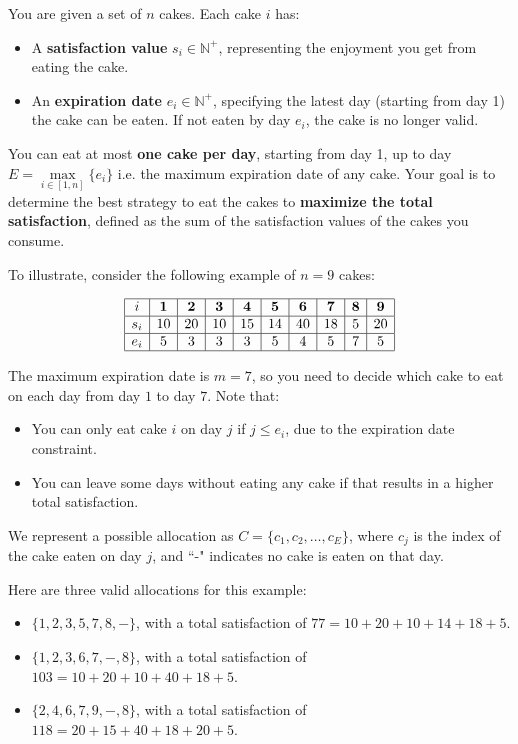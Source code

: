  
You are given a set of \( n \) cakes. Each cake \( i \) has:
\begin{itemize}
    \item A \textbf{satisfaction value} \( s_i\in\mathbb N^+ \), representing the enjoyment you get from eating the cake.
    \item An \textbf{expiration date} \( e_i\in\mathbb N^+ \), specifying the latest day (starting from day 1) the cake can be eaten. If not eaten by day \( e_i \), the cake is no longer valid.
\end{itemize}

You can eat at most \textbf{one cake per day}, starting from day 1, up to day $E=\max\limits_{i\in[1,n]} \{e_i\}$ i.e. the maximum expiration date of any cake. Your goal is to determine the best strategy to eat the cakes to \textbf{maximize the total satisfaction}, defined as the sum of the satisfaction values of the cakes you consume.

To illustrate, consider the following example of \( n = 9 \) cakes:

\[
\begin{array}{|c|c|c|c|c|c|c|c|c|c|c|}
    \hline
    i & \textbf{1} & \textbf{2} & \textbf{3} & \textbf{4} & \textbf{5} & \textbf{6} & \textbf{7} & \textbf{8} & \textbf{9} \\ \hline
    s_i & 10 & 20 & 10 & 15 & 14 & 40 & 18 & 5 & 20 \\ \hline
    e_i & 5 & 3 & 3 & 3 & 5 & 4 & 5 & 7 & 5 \\ \hline
\end{array}
\]

The maximum expiration date is \( m=7 \), so you need to decide which cake to eat on each day from day \( 1 \) to day \( 7 \). Note that:
\begin{itemize}
    \item You can only eat cake \( i \) on day \( j \) if \( j \leq e_i \), due to the expiration date constraint.
    \item You can leave some days without eating any cake if that results in a higher total satisfaction.
\end{itemize}

We represent a possible allocation as \( C=\{c_1, c_2, \dots, c_E\} \), where \(c_j\) is the index of the cake eaten on day \( j \), and ``-" indicates no cake is eaten on that day.

Here are three valid allocations for this example:
\begin{itemize}
    \item \( \{1, 2, 3, 5, 7, 8, -\} \), with a total satisfaction of \( 77 = 10 + 20 + 10 + 14 + 18 + 5 \).
    \item \( \{1, 2, 3, 6, 7, -, 8\} \), with a total satisfaction of \( 103 = 10 + 20 + 10 + 40 + 18 + 5 \).
    \item \( \{2, 4, 6, 7, 9, -, 8\} \), with a total satisfaction of \( 118 = 20 + 15 + 40 + 18 + 20 + 5 \).
\end{itemize}

